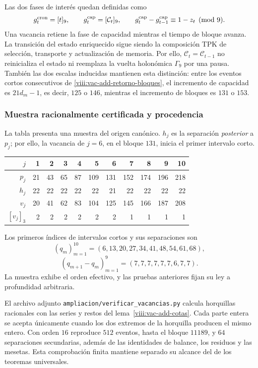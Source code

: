 Las dos fases de interés quedan definidas como
\[
 g_t^{\rm cron}=[t]_9,
 \qquad g_t^{\rm cap}=[\mathcal C_t]_9,
 \qquad
 g_t^{\rm cap}-g_{t-1}^{\rm cap}\equiv1-z_t\pmod9.
\]
Una vacancia retiene la fase de capacidad mientras el tiempo de bloque
avanza. La transición del estado enriquecido sigue siendo la composición
TPK de selección, transporte y actualización de memoria. Por ello,
\(\mathcal C_t=\mathcal C_{t-1}\) no reinicializa el estado ni
reemplaza la vuelta holonómica \(\Gamma_9\) por una pausa. También
las dos escalas inducidas mantienen esta distinción: entre los eventos
cortos consecutivos de \eqref{viii:vac-add-retorno-bloques}, el incremento de
capacidad es \(21d_m-1\), es decir, \(125\) o \(146\), mientras
el incremento de bloques es \(131\) o \(153\).

\subsubsection{Muestra racionalmente certificada y procedencia}
\label{viii:vac-add-muestra}

La tabla presenta una muestra del origen canónico. \(h_j\) es la
separación \emph{posterior} a \(p_j\); por ello, la vacancia de
\(j=6\), en el bloque \(131\), inicia el primer intervalo corto.
\begin{center}
\small
\begin{tabular}{r|rrrrrrrrrr}
\toprule
\(j\)&1&2&3&4&5&6&7&8&9&10\\
\midrule
\(p_j\)&21&43&65&87&109&131&152&174&196&218\\
\(h_j\)&22&22&22&22&22&21&22&22&22&22\\
\(v_j\)&20&41&62&83&104&125&145&166&187&208\\
\([v_j]_3\)&2&2&2&2&2&2&1&1&1&1\\
\bottomrule
\end{tabular}
\end{center}
Los primeros índices de intervalos cortos y sus separaciones son
\[
 (q_m)_{m=1}^{10}=(6,13,20,27,34,41,48,54,61,68),
\]
\[
 (q_{m+1}-q_m)_{m=1}^{9}=(7,7,7,7,7,7,6,7,7).
\]
La muestra exhibe el orden efectivo, y las pruebas anteriores fijan
su ley a profundidad arbitraria.

El archivo adjunto \texttt{ampliacion/verificar\_vacancias.py} calcula
horquillas racionales con las series y restos del
lema~\ref{viii:vac-add-cotas}. Cada parte entera se acepta únicamente cuando
los dos extremos de la horquilla producen el mismo entero. Con orden
\(16\) reproduce \(512\) eventos, hasta el bloque \(11189\), y
\(64\) separaciones secundarias, además de las identidades de balance,
los residuos y las mesetas. Esta comprobación finita mantiene separado
su alcance del de los teoremas universales.

